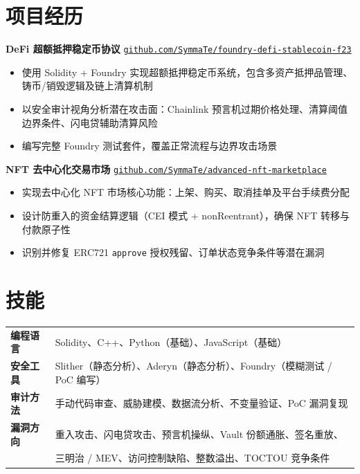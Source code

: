 \documentclass[8.5pt, a4paper]{article}
\begin{document}

\section{项目经历}

\noindent\textbf{DeFi 超额抵押稳定币协议} \hfill
\href{https://github.com/SymmaTe/foundry-defi-stablecoin-f23}{\small\texttt{github.com/SymmaTe/foundry-defi-stablecoin-f23}}

\begin{itemize}
  \item 使用 Solidity + Foundry 实现超额抵押稳定币系统，包含多资产抵押品管理、铸币/销毁逻辑及链上清算机制
  \item 以安全审计视角分析潜在攻击面：Chainlink 预言机过期价格处理、清算阈值边界条件、闪电贷辅助清算风险
  \item 编写完整 Foundry 测试套件，覆盖正常流程与边界攻击场景
\end{itemize}

\vspace{3pt}
\noindent\textbf{NFT 去中心化交易市场} \hfill
\href{https://github.com/SymmaTe/advanced-nft-marketplace}{\small\texttt{github.com/SymmaTe/advanced-nft-marketplace}}

\begin{itemize}
  \item 实现去中心化 NFT 市场核心功能：上架、购买、取消挂单及平台手续费分配
  \item 设计防重入的资金结算逻辑（CEI 模式 + nonReentrant），确保 NFT 转移与付款原子性
  \item 识别并修复 ERC721 \texttt{approve} 授权残留、订单状态竞争条件等潜在漏洞
\end{itemize}


\section{技能}

\begin{tabularx}{\textwidth}{@{} l X @{}}
  \textbf{编程语言}   & Solidity、C++、Python（基础）、JavaScript（基础）\\[4pt]
  \textbf{安全工具}   & Slither（静态分析）、Aderyn（静态分析）、Foundry（模糊测试 / PoC 编写）\\[4pt]
  \textbf{审计方法}   & 手动代码审查、威胁建模、数据流分析、不变量验证、PoC 漏洞复现\\[4pt]
  \textbf{漏洞方向}   & 重入攻击、闪电贷攻击、预言机操纵、Vault 份额通胀、签名重放、\\
                      & 三明治 / MEV、访问控制缺陷、整数溢出、TOCTOU 竞争条件 \\
\end{tabularx}
\end{document}
